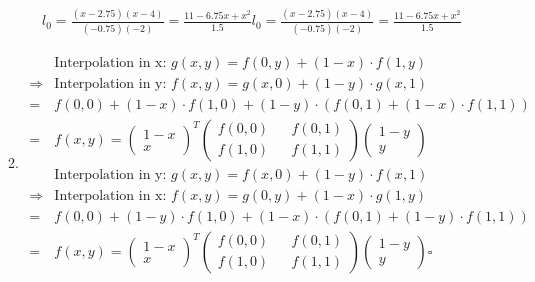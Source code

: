 \documentclass[]{book}
\theoremstyle{definition}
\begin{document}
\begin{enumerate}
\begin{enumerate}
\begin{align*}
            l_0 = \frac{(x - 2.75)(x -4)}{(-0.75)(-2)} = \frac{11 - 6.75 x + x^2}{1.5}            l_0 = \frac{(x - 2.75)(x -4)}{(-0.75)(-2)} = \frac{11 - 6.75 x + x^2}{1.5}
        \end{align*}
        \item \begin{align*}
            & \text{Interpolation in x: } g(x, y) = f(0, y) + (1 - x) \cdot f(1, y) \\
            \Rightarrow & \text{Interpolation in y: } f(x, y) = g(x, 0) + (1 - y) \cdot g(x, 1) \\ 
            = & f(0, 0) + (1 - x) \cdot f(1, 0) + (1 - y) \cdot (f(0, 1) + (1 - x) \cdot f(1, 1)) \\
            = & f(x, y) = \begin{pmatrix}
                1 - x \\
                x
            \end{pmatrix}^T
            \begin{pmatrix}
                f(0, 0) && f(0, 1)\\
                f(1, 0) && f(1, 1)
            \end{pmatrix}
            \begin{pmatrix}
                1 - y \\
                y
            \end{pmatrix} \\
            & \text{Interpolation in y: } g(x, y) = f(x, 0) + (1 - y) \cdot f(x, 1) \\
            \Rightarrow & \text{Interpolation in x: } f(x, y) = g(0, y) + (1 - x) \cdot g(1, y) \\
            = & f(0, 0) + (1 - y) \cdot f(1, 0) + (1 - x) \cdot (f(0, 1) + (1 - y) \cdot f(1, 1)) \\
            = & f(x, y) = \begin{pmatrix}
                1 - x \\
                x
            \end{pmatrix}^T
            \begin{pmatrix}
                f(0, 0) && f(0, 1)\\
                f(1, 0) && f(1, 1)
            \end{pmatrix}
            \begin{pmatrix}
                1 - y \\
                y
            \end{pmatrix} \square
        \end{align*}
    \end{enumerate}
\end{enumerate}
\end{document}
